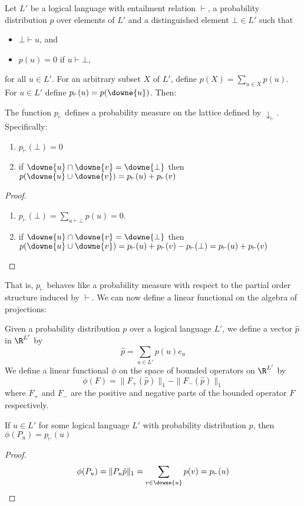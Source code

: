 Let $L'$ be a logical language with entailment relation $\vdash$, a probability distribution $p$ over elements of $L'$ and a distinguished element $\bot \in L'$ such that
\begin{itemize}
\item $\bot \vdash u$, and
\item $p(u) = 0$ if $u \vdash \bot$,
\end{itemize}
for all $u \in L'$. For an arbitrary subset $X$ of $L'$, define $p(X) = \sum_{u\in X}p(u)$. For $u \in L'$ define $p_\vdash(u) = p(\downe{u})$. Then:
\begin{prop}
The function $p_\vdash$ defines a probability measure on the lattice defined by $\downarrow_\vdash$. Specifically:
\begin{enumerate}
\item $p_\vdash(\bot) = 0$
\item if $\downe{u} \cap \downe{v} = \downe{\bot}$ then $p(\downe{u} \cup \downe{v}) = p_\vdash(u) + p_\vdash(v)$
\end{enumerate}
\end{prop}
\begin{proof}
\mbox{}
\begin{enumerate}
\item $p_\vdash(\bot) = \sum_{u\vdash\bot}p(u) = 0$.
\item if $\downe{u} \cap \downe{v} = \downe{\bot}$ then $p(\downe{u} \cup \downe{v}) = p_\vdash(u) + p_\vdash(v) - p_\vdash(\bot) =  p_\vdash(u) + p_\vdash(v)$
\end{enumerate}
\end{proof}
That is, $p_\vdash$ behaves like a probability measure with respect to the partial order structure induced by $\vdash$. We can now define a linear functional on the algebra of projections:
\begin{defn}
Given a probability distribution $p$ over a logical language $L'$, we define a vector $\hat{p}$ in $\R^{L'}$ by
$$\hat{p} = \sum_{u \in L'} p(u)e_u$$
We define a linear functional $\phi$ on  the space of bounded operators on $\R^{L'}$  by
$$\phi(F) = \|F_+(\hat{p})\|_1 - \|F_-(\hat{p})\|_1$$
where $F_+$ and $F_-$ are the positive and negative parts of the bounded operator $F$ respectively.
\end{defn}
\begin{prop} If $u \in L'$ for some logical language $L'$ with probability distribution $p$, then
$\phi(P_u) = p_\vdash(u)$
\end{prop}
\begin{proof}
$$\phi(P_u) = \|P_u\hat{p}\|_1 = \sum_{v \in \downe{u}}p(v) = p_\vdash(u)$$
\end{proof}

